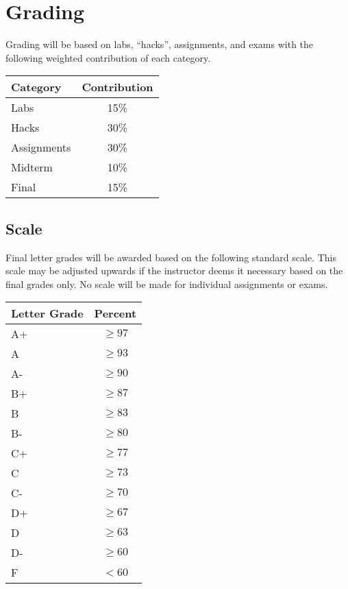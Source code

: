 \documentclass[12pt]{scrartcl}
\begin{document}
\section{Grading}

Grading will be based on labs, ``hacks'', assignments, and exams
with the following weighted contribution of each category.

\begin{table}[h]
\centering
\begin{tabular}{lc}
Category & Contribution \\
\hline\hline
Labs  & 15\% \\
Hacks & 30\% \\
Assignments & 30\% \\
Midterm & 10\% \\
Final & 15\% \\
\end{tabular}
\end{table}

\subsection{Scale}

Final letter grades will be awarded based on the following 
standard scale. This scale may be adjusted upwards if the 
instructor deems it necessary based on the final grades only.  
No scale will be made for individual assignments or exams.

\begin{table}[h]
\centering
\begin{tabular}{p{1cm}c}
Letter Grade & Percent \\
\hline\hline
A+ & $\geq 97$ \\
A  & $\geq 93$ \\
A- & $\geq 90$ \\
B+ & $\geq 87$ \\
B  & $\geq 83$ \\
B- & $\geq 80$ \\
C+ & $\geq 77$ \\
C  & $\geq 73$ \\
C- & $\geq 70$ \\
D+ & $\geq 67$ \\
D  & $\geq 63$ \\
D- & $\geq 60$ \\
F  & $<60$ \\
\end{tabular}
\end{table}
\end{document}
